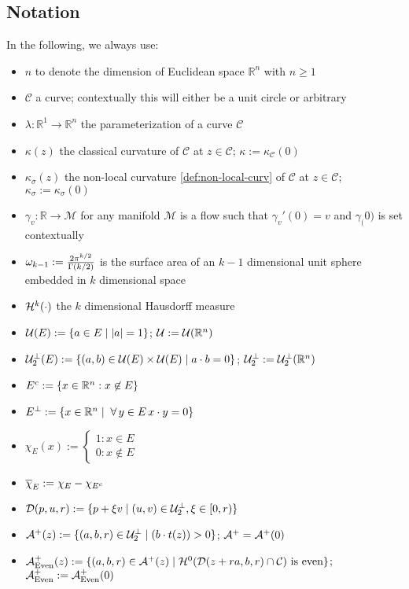 \documentclass{article}
\newcommand{\haus}[2]{\mathcal{H}^{#1}\parens{#2}}
\newcommand{\R}[1]{\mathbb{R}^{#1}}
\newcommand{\optparens}[1]{\ifthenelse{\equal{#1}{}}{}{\parens{#1}}}
\newcommand{\U}[1]{\mathcal{U}\optparens{#1}}
\newcommand{\UTP}[1]{\mathcal{U}_2^\perp\optparens{#1}}
\newcommand{\chit}[2]{\overline{\chi}_{#1}\optparens{#2}}
\newcommand{\D}[1]{\mathcal{D}\optparens{#1}}
\newcommand{\A}{\mathcal{A}^{+}}
\newcommand{\Ae}{\A_{\textup{Even}}}
\newcommand{\C}{\mathcal{C}}
\newcommand{\ks}{\kappa_\sigma}
\newcommand{\gflow}[1]{\gamma_{#1}}
\renewcommand{\dot}[2]{{#1}\cdot{#2}}
\newcommand{\pdot}[2]{\parens{\dot{#1}{#2}}}
\begin{document}
\subsection{Notation}%
In the following, we always use:
\begin{itemize}
  \item $n$ to denote the dimension of Euclidean space $\R{n}$ with $n \ge 1$
  \item $\C$ a curve; contextually this will either be a unit circle or arbitrary
  \item $\lambda : \R{1} \to \R{n}$ the parameterization of a curve $\mathcal{C}$
  \item $\kappa(z)$ the classical curvature of $\mathcal{C}$ at $z \in \mathcal{C}$; $\kappa := \kappa_{\mathcal{C}}(0)$
  \item $\ks(z)$ the non-local curvature \eqref{def:non-local-curv} of $\mathcal{C}$ at $z \in \mathcal{C}$; $\ks := \ks(0)$
  \item $\gflow{v} : \mathbb{R} \to \mathcal{M}$ for any manifold $\mathcal{M}$ is a flow such that $\gflow{v}'(0) = v$ and $\gflow(0)$ is set contextually
  \item $\omega_{k-1} := \frac{2\pi^{k/2}}{\Gamma(k/2)}$ is the surface area of an $k-1$ dimensional unit sphere embedded in $k$ dimensional space
  \item $\haus{k}{\cdot}$ the $k$ dimensional Hausdorff measure
  \item $\U{E} := \braces{ a \in E \mid \abs{a} = 1 }$; $\U{} := \U{\R{n}}$
  \item $\UTP{E} := \braces{ (a, b) \in \U{E} \times \U{E} \mid \dot{a}{b} = 0 }$; $\UTP{} := \UTP{\R{n}}$
  \item $E^c := \braces{ x \in \R{n} : x \not\in E }$
  \item $E^\perp := \braces{ x \in \R{n} \mid \forall y \in E \, \dot{x}{y} = 0 }$
  \item $\chi_E(x) := \begin{cases} 1 : x \in E \\ 0 : x \not\in E \end{cases}$
  \item $\chit{E}{} := \chi_E - \chi_{E^c}$
  \item $\D{p, u, r} := \braces{ p + \xi v \mid \parens{u, v} \in \UTP{}, \xi \in [0, r) }$
  \item $\A\parens{z} := \braces{\parens{a, b, r} \in \UTP{} \mid \pdot{b}{t(z)} > 0}$; $\A = \A\parens{0}$
  \item $\Ae \parens{z} := \braces{\parens{a, b, r} \in \A{}\parens{z} \mid \haus{0}{\D{z + ra, b, r} \cap \C} \text{ is even}}$; $\Ae := \Ae\parens{0}$

\end{itemize}
\end{document}
